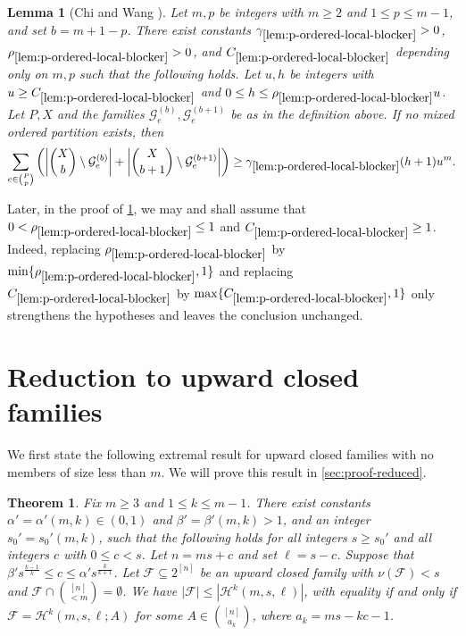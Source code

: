 \documentclass[10pt,a4paper]{article}
\numberwithin{equation}{section}
\newtheorem{theorem}{Theorem}[section]
\newtheorem{lemma}[lemma]{Lemma}
\theoremstyle{definition}
\newcommand{\F}{\mathcal F}
\newcommand{\G}{\mathcal G}
\begin{document}
\begin{lemma}[Chi and Wang \cite{ChiWangK2}]\label{lem:p-ordered-local-blocker}
        Let $m,p$ be integers with $m\ge2$ and $1\le p\le m-1$, and set $b=m+1-p$.
        There exist constants $\gamma_{\ref{lem:p-ordered-local-blocker}}>0$, $\rho_{\ref{lem:p-ordered-local-blocker}}>0$, and $C_{\ref{lem:p-ordered-local-blocker}}$ depending only on $m,p$ such that the following holds.
        Let $u,h$ be integers with $u\ge C_{\ref{lem:p-ordered-local-blocker}}$ and $0\le h\le\rho_{\ref{lem:p-ordered-local-blocker}}u$.
        Let $P,X$ and the families $\G_e^{(b)},\G_e^{(b+1)}$ be as in the definition above.
        If no mixed ordered partition exists, then
        \[
                \sum_{e\in\binom Pp}
                \left(
                \left|\binom Xb\setminus\G_e^{(b)}\right|
                +
                \left|\binom X{b+1}\setminus\G_e^{(b+1)}\right|
                \right)
                \ge \gamma_{\ref{lem:p-ordered-local-blocker}}(h+1)u^m.
        \]
\end{lemma}

\medskip
{} Later, in the proof of \cref{thm:reduced-all}, we may and shall assume that
$0<\rho_{\ref{lem:p-ordered-local-blocker}}\le1$ and
$C_{\ref{lem:p-ordered-local-blocker}}\ge1$.
Indeed, replacing $\rho_{\ref{lem:p-ordered-local-blocker}}$ by
$\min\{\rho_{\ref{lem:p-ordered-local-blocker}},1\}$ and replacing
$C_{\ref{lem:p-ordered-local-blocker}}$ by
$\max\{C_{\ref{lem:p-ordered-local-blocker}},1\}$ only strengthens
the hypotheses and leaves the conclusion unchanged.


\section{Reduction to upward closed families}\label{sec:proof-main}

We first state the following extremal result for upward closed families with no members of size less than $m$.
We will prove this result in \cref{sec:proof-reduced}.
\begin{theorem}\label{thm:reduced-all}
        Fix $m\ge3$ and $1\le k\le m-1$.
        There exist constants $\alpha'=\alpha'(m,k)\in(0,1)$ and $\beta'=\beta'(m,k)>1$, and an integer $s_0'=s_0'(m,k)$, such that the following holds for all integers $s\ge s_0'$ and all integers $c$ with $0\le c<s$.
        Let $n=ms+c$ and set $\ell=s-c$.
        Suppose that $\beta' s^{\frac{k-1}{k}}\le c\le\alpha' s^{\frac k{k+1}}$.
        Let $\F\subseteq2^{[n]}$ be an upward closed family with $\nu(\F)<s$ and $\F\cap\binom{[n]}{<m}=\emptyset$.
        We have $|\F|\le |\mathcal H^k(m,s,\ell)|$, with equality if and only if $\F=\mathcal H^k(m,s,\ell;A)$ for some $A\in\binom{[n]}{a_k}$, where $a_k=ms-kc-1$.
\end{theorem}
\end{document}
